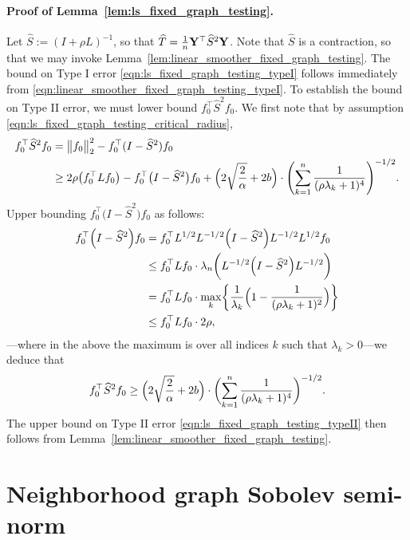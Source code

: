 \documentclass[twoside]{article}
\newcommand{\1}{\mathbf{1}}
\newcommand{\Lap}{L}
\newcommand{\Id}{I}
\newcommand{\wh}[1]{\widehat{#1}}
\theoremstyle{definition}
\theoremstyle{remark}
\begin{document}
\paragraph{Proof of Lemma~\ref{lem:ls_fixed_graph_testing}.}
Let $\wh{S} := (I + \rho L)^{-1}$, so that $\wh{T} = \frac{1}{n}{\bf Y}^{\top} \wh{S}^2 {\bf Y}$. Note that $\wh{S}$ is a contraction, so that we may invoke Lemma~\ref{lem:linear_smoother_fixed_graph_testing}. The bound on Type I error \eqref{eqn:ls_fixed_graph_testing_typeI} follows immediately from \eqref{eqn:linear_smoother_fixed_graph_testing_typeI}. 
To establish the bound on Type II error, we must lower bound $f_0^{\top} \wh{S}^2 f_0$. We first note that by assumption \eqref{eqn:ls_fixed_graph_testing_critical_radius},
\begin{align*}
f_0^{\top} \wh{S}^2 f_0 & = \bigl\|f_0\bigr\|_2^2 - f_0^{\top}(I - \wh{S}^2)f_0 \\
& \geq 2 \rho \bigl(f_0^{\top} \Lap f_0\bigr) - f_0^{\top}\bigl(I - \wh{S}^2\bigr)f_0 +  \Bigl(2\sqrt{\frac{2}{\alpha}} + 2b\Bigr) \cdot \Biggl(\sum_{k = 1}^{n} \frac{1}{(\rho\lambda_k + 1)^4} \Biggr)^{-1/2}.
\end{align*}
Upper bounding $f_0^{\top}\bigl(I - \wh{S}^2\bigr)f_0$ as follows:
\begin{equation*}
\begin{aligned}
f_0^{\top} \Bigl(\Id - \wh{S}^2\Bigr) f_0  & = f_0^{\top} \Lap^{1/2} \Lap^{-1/2}\Bigl(\Id - \wh{S}^2\Bigr) \Lap^{-1/2} \Lap^{1/2} f_0 \\ 
& \leq f_0^{\top} \Lap f_0 \cdot  \lambda_{n}\biggl(\Lap^{-1/2}\Bigl(\Id - \wh{S}^2\Bigr) \Lap^{-1/2}\biggr) \\ 
& = f_0^{\top} \Lap f_0 \cdot \max_{k} \biggl\{ \frac{1}{\lambda_k} \Bigl(1 - \frac{1}{(\rho \lambda_k + 1)^2}\Bigr) \biggr\} \\
& \leq f_0^{\top} \Lap f_0 \cdot 2\rho,
\end{aligned}
\end{equation*}
---where in the above the maximum is over all indices $k$ such that $\lambda_k > 0$---we deduce that
\begin{equation*}
f_0^{\top} \wh{S}^2 f_0 \geq  \Bigl(2\sqrt{\frac{2}{\alpha}} + 2b\Bigr) \cdot \biggl(\sum_{k = 1}^{n} \frac{1}{(\rho\lambda_k + 1)^4} \biggr)^{-1/2}.
\end{equation*} 
The upper bound on Type II error \eqref{eqn:ls_fixed_graph_testing_typeII} then follows from Lemma~\ref{lem:linear_smoother_fixed_graph_testing}.

\section{Neighborhood graph Sobolev semi-norm}
\label{sec:graph_sobolev_seminorm}
\end{document}
